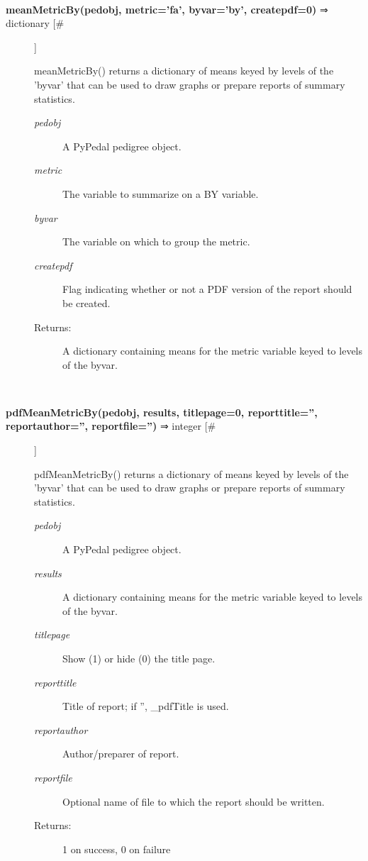 \documentclass[10pt]{article}
\begin{document}
\begin{description}
\begin{description}
\end{description}
\\ 

\item[\textbf{meanMetricBy(pedobj, metric='fa', byvar='by', createpdf=0)}
 ⇒ dictionary [\#]]

 meanMetricBy() returns a dictionary of means keyed by levels of the 'byvar' that can be used to draw graphs or prepare reports of summary statistics.
\begin{description}
\item[\emph{pedobj}
] A PyPedal pedigree object.
\item[\emph{metric}
] The variable to summarize on a BY variable.
\item[\emph{byvar}
] The variable on which to group the metric.
\item[\emph{createpdf}
] Flag indicating whether or not a PDF version of the report should be created.
\item[Returns:] A dictionary containing means for the metric variable keyed to levels of the byvar.

\end{description}
\\ 

\item[\textbf{pdfMeanMetricBy(pedobj, results, titlepage=0, reporttitle='', reportauthor='', reportfile='')}
 ⇒ integer [\#]]

 pdfMeanMetricBy() returns a dictionary of means keyed by levels of the 'byvar' that can be used to draw graphs or prepare reports of summary statistics.
\begin{description}
\item[\emph{pedobj}
] A PyPedal pedigree object.
\item[\emph{results}
] A dictionary containing means for the metric variable keyed to levels of the byvar.
\item[\emph{titlepage}
] Show (1) or hide (0) the title page.
\item[\emph{reporttitle}
] Title of report; if '', \_pdfTitle is used.
\item[\emph{reportauthor}
] Author/preparer of report.
\item[\emph{reportfile}
] Optional name of file to which the report should be written.
\item[Returns:] 1 on success, 0 on failure

\end{description}
\\ 


\end{description}
\end{document}
